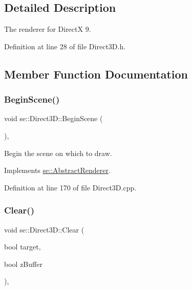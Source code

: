 \subsection{Detailed Description}
The renderer for DirectX 9. 

Definition at line 28 of file Direct3\+D.\+h.



\subsection{Member Function Documentation}
\mbox{\label{classse_1_1_direct3_d_a0509351979bce1ab27d7cbd6cdc4b5de}} 
\subsubsection{\texorpdfstring{Begin\+Scene()}{BeginScene()}}
{\footnotesize\ttfamily void se\+::\+Direct3\+D\+::\+Begin\+Scene (\begin{DoxyParamCaption}{ }\end{DoxyParamCaption})\hspace{0.3cm}{\ttfamily [override]}, {\ttfamily [virtual]}}

Begin the scene on which to draw. 

Implements \mbox{\hyperlink{classse_1_1_abstract_renderer_aae5f9f2f51f290846e4ffd9e2a3d2a8e}{se\+::\+Abstract\+Renderer}}.



Definition at line 170 of file Direct3\+D.\+cpp.

\mbox{\label{classse_1_1_direct3_d_a932f57e7ffc1ae9b796599a36e861d02}} 
\subsubsection{\texorpdfstring{Clear()}{Clear()}}
{\footnotesize\ttfamily void se\+::\+Direct3\+D\+::\+Clear (\begin{DoxyParamCaption}\item[{bool}]{target,  }\item[{bool}]{z\+Buffer }\end{DoxyParamCaption})\hspace{0.3cm}{\ttfamily [override]}, {\ttfamily [virtual]}}

